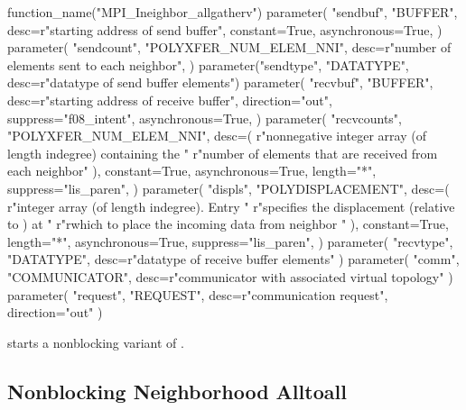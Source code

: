 \begin{mpi-binding}
    function_name("MPI_Ineighbor_allgatherv")
    parameter(
        "sendbuf",
        "BUFFER",
        desc=r"starting address of send buffer",
        constant=True,
        asynchronous=True,
    )
    parameter(
        "sendcount",
        "POLYXFER_NUM_ELEM_NNI",
        desc=r"number of elements sent to each neighbor",
    )
    parameter("sendtype", "DATATYPE", desc=r"datatype of send buffer elements")
    parameter(
        "recvbuf",
        "BUFFER",
        desc=r"starting address of receive buffer",
        direction="out",
        suppress="f08_intent",
        asynchronous=True,
    )
    parameter(
        "recvcounts",
        "POLYXFER_NUM_ELEM_NNI",
        desc=(
            r"nonnegative integer array (of length indegree) containing the "
            r"number of elements that are received from each neighbor"
        ),
        constant=True,
        asynchronous=True,
        length="*",
        suppress="lis_paren",
    )
    parameter(
        "displs",
        "POLYDISPLACEMENT",
        desc=(
            r"integer array (of length indegree). Entry  "
            r"specifies the displacement (relative to ) at "
            r"rwhich to place the incoming data from neighbor "
        ),
        constant=True,
        length="*",
        asynchronous=True,
        suppress="lis_paren",
    )
    parameter(
        "recvtype", "DATATYPE", desc=r"datatype of receive buffer elements"
    )
    parameter(
        "comm", "COMMUNICATOR", desc=r"communicator with associated virtual topology"
    )
    parameter(
        "request", "REQUEST", desc=r"communication request", direction="out"
    )
\end{mpi-binding}

%
 starts a nonblocking variant of
.

\subsection{Nonblocking Neighborhood Alltoall}

